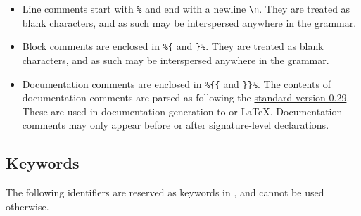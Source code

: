 \begin{itemize}
\item
Line comments start with \texttt{\%} and end with a newline \texttt{\textbackslash n}.
They are treated as blank characters, and as such may be interspersed anywhere in the grammar.
\item
Block comments are enclosed in \texttt{\%\{} and \texttt{\}\%}.
They are treated as blank characters, and as such may be interspersed anywhere in the grammar.
\item
Documentation comments are enclosed in \texttt{\%\{\{} and \texttt{\}\}\%}.
The contents of documentation comments are parsed as \Markdown following the \href{https://spec.commonmark.org/0.29}{\Commonmark standard version 0.29}.
These are used in documentation generation to \HTML or \LaTeX.
Documentation comments may only appear before or after signature-level declarations.
\end{itemize}

\subsection{Keywords}\label{section:keywords-lexical-convention}

The following identifiers are reserved as keywords in \Beluga, and cannot be used otherwise.

